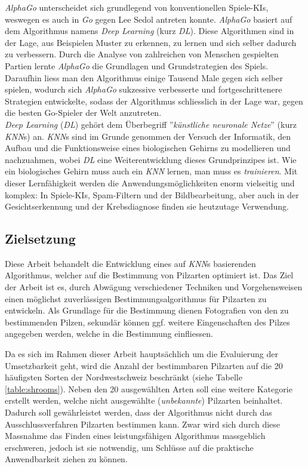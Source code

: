\vspace{0.5cm}

\textit{AlphaGo} unterscheidet sich grundlegend von konventionellen Spiele-KIs, weswegen es auch in \textit{Go} gegen Lee Sedol antreten konnte. \textit{AlphaGo} basiert auf dem Algorithmus namens \textit{Deep Learning} (kurz \textit{DL}). Diese Algorithmen sind in der Lage, aus Beispielen Muster zu erkennen, zu lernen und sich selber dadurch zu verbessern. Durch die Analyse von zahlreichen von Menschen gespielten Partien lernte \textit{AlphaGo} die Grundlagen und Grundstrategien des Spiels. Daraufhin liess man den Algorithmus einige Tausend Male gegen sich selber spielen, wodurch sich \textit{AlphaGo} sukzessive verbesserte und fortgeschrittenere Strategien entwickelte, sodass der Algorithmus schliesslich in der Lage war, gegen die besten Go-Spieler der Welt anzutreten.\\

\textit{Deep Learning} (\textit{DL}) gehört dem Überbegriff ''\textit{künstliche neuronale Netze}'' (kurz \textit{KNN}s) an. \textit{KNN}s sind im Grunde genommen der Versuch der Informatik, den Aufbau und die Funktionsweise eines biologischen Gehirns zu modellieren und nachzuahmen, wobei \textit{DL} eine Weiterentwicklung dieses Grundprinzipes ist. Wie ein biologisches Gehirn muss auch ein \textit{KNN} lernen, man muss es \textit{trainieren}. Mit dieser Lernfähigkeit werden die Anwendungsmöglichkeiten enorm vielseitig und komplex: In Spiele-KIs, Spam-Filtern und der Bildbearbeitung, aber auch in der Gesichtserkennung und der Krebsdiagnose finden sie heutzutage Verwendung. 

\subsection{Zielsetzung}\label{cha:intr:aim}

Diese Arbeit behandelt die Entwicklung eines auf \textit{KNN}s basierenden Algorithmus, welcher auf die Bestimmung von Pilzarten optimiert ist. Das Ziel der Arbeit ist es, durch Abwägung verschiedener Techniken und Vorgehensweisen einen möglichst zuverlässigen Bestimmungsalgorithmus für Pilzarten zu entwickeln. Als Grundlage für die Bestimmung dienen Fotografien von den zu bestimmenden Pilzen, sekundär können ggf. weitere Eingenschaften des Pilzes angegeben werden, welche in die Bestimmung einfliessen.

Da es sich im Rahmen dieser Arbeit hauptsächlich um die Evaluierung der Umsetzbarkeit geht, wird die Anzahl der bestimmbaren Pilzarten auf die 20 häufigsten Sorten der Nordwestschweiz beschränkt (siehe Tabelle \ref{table:shrooms}). Neben den 20 ausgewählten Arten soll eine weitere Kategorie erstellt werden, welche nicht ausgewählte (\textit{unbekannte}) Pilzarten beinhaltet. Dadurch soll gewährleistet werden, dass der Algorithmus nicht durch das Ausschlussverfahren Pilzarten bestimmen kann. Zwar wird sich durch diese Massnahme das Finden eines leistungsfähigen Algorithmus massgeblich erschweren, jedoch ist sie notwendig, um Schlüsse auf die praktische Anwendbarkeit ziehen zu können.

